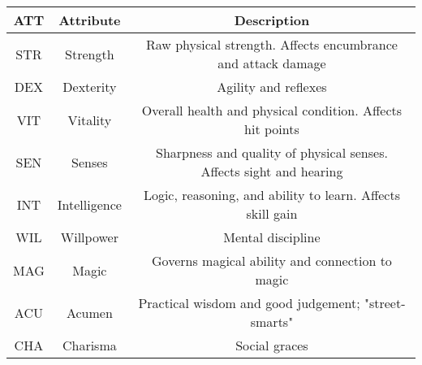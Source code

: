 
\begin{table}[h!]
    \begin{tabular}{|c|c|c|}
        \hline
        ATT & Attribute & Description \\
        \hline
        STR & Strength & Raw physical strength. Affects encumbrance and attack damage \\
        DEX & Dexterity & Agility and reflexes \\
        VIT & Vitality & Overall health and physical condition. Affects hit points \\
        SEN & Senses & Sharpness and quality of physical senses. Affects sight and hearing \\
        INT & Intelligence & Logic, reasoning, and ability to learn. Affects skill gain \\
        WIL & Willpower & Mental discipline \\
        MAG & Magic & Governs magical ability and connection to magic \\
        ACU & Acumen & Practical wisdom and good judgement; "street-smarts" \\
        CHA & Charisma & Social graces \\
        \hline
    \end{tabular}
    \label{tab:attributes}
\end{table}
